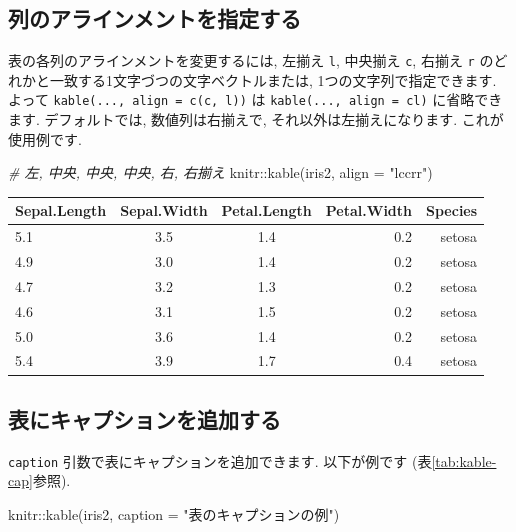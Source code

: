 \documentclass[
  11pt,
  lualatex,
  ja=standard]{bxjsreport}
\newenvironment{Shaded}{\begin{snugshade}}{\end{snugshade}}
\newcommand{\AttributeTok}[1]{\textcolor[rgb]{0.77,0.63,0.00}{#1}}
\newcommand{\CommentTok}[1]{\textcolor[rgb]{0.56,0.35,0.01}{\textit{#1}}}
\newcommand{\FunctionTok}[1]{\textcolor[rgb]{0.00,0.00,0.00}{#1}}
\newcommand{\NormalTok}[1]{#1}
\newcommand{\SpecialCharTok}[1]{\textcolor[rgb]{0.00,0.00,0.00}{#1}}
\newcommand{\StringTok}[1]{\textcolor[rgb]{0.31,0.60,0.02}{#1}}
\begin{document}
\hypertarget{specify-column-alignment}{%
\subsection{列のアラインメントを指定する}\label{specify-column-alignment}}

表の各列のアラインメントを変更するには, 左揃え \texttt{l}, 中央揃え \texttt{c}, 右揃え \texttt{r} のどれかと一致する1文字づつの文字ベクトルまたは, 1つの文字列で指定できます. よって \texttt{kable(..., align = c(\textquotesingle{}c\textquotesingle{},\ \textquotesingle{}l\textquotesingle{}))} は \texttt{kable(..., align = \textquotesingle{}cl\textquotesingle{})} に省略できます. デフォルトでは, 数値列は右揃えで, それ以外は左揃えになります. これが使用例です.

\begin{Shaded}
\begin{Highlighting}[numbers=left,,]
\CommentTok{\# 左, 中央, 中央, 中央, 右, 右揃え}
\NormalTok{knitr}\SpecialCharTok{::}\FunctionTok{kable}\NormalTok{(iris2, }\AttributeTok{align =} \StringTok{"lccrr"}\NormalTok{)}
\end{Highlighting}
\end{Shaded}

\begin{tabular}{l|c|c|r|r}
\hline
Sepal.Length & Sepal.Width & Petal.Length & Petal.Width & Species\\
\hline
5.1 & 3.5 & 1.4 & 0.2 & setosa\\
\hline
4.9 & 3.0 & 1.4 & 0.2 & setosa\\
\hline
4.7 & 3.2 & 1.3 & 0.2 & setosa\\
\hline
4.6 & 3.1 & 1.5 & 0.2 & setosa\\
\hline
5.0 & 3.6 & 1.4 & 0.2 & setosa\\
\hline
5.4 & 3.9 & 1.7 & 0.4 & setosa\\
\hline
\end{tabular}

\hypertarget{kable-caption}{%
\subsection{表にキャプションを追加する}\label{kable-caption}}

\texttt{caption} 引数で表にキャプションを追加できます. 以下が例です (表\ref{tab:kable-cap}参照).

\begin{Shaded}
\begin{Highlighting}[numbers=left,,]
\NormalTok{knitr}\SpecialCharTok{::}\FunctionTok{kable}\NormalTok{(iris2, }\AttributeTok{caption =} \StringTok{"表のキャプションの例"}\NormalTok{)}
\end{Highlighting}
\end{Shaded}
\end{document}
